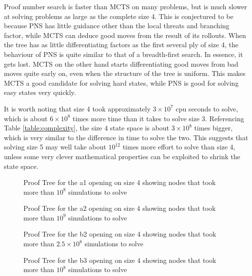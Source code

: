 Proof number search is faster than MCTS on many problems, but is much slower at solving problems as large as the complete size 4. This is conjectured to be because PNS has little guidance other than the local threats and branching factor, while MCTS can deduce good moves from the result of its rollouts. When the tree has as little differentiating factors as the first several ply of size 4, the behaviour of PNS is quite similar to that of a breadth-first search. In essence, it gets lost. MCTS on the other hand starts differentiating good moves from bad moves quite early on, even when the structure of the tree is uniform. This makes MCTS a good candidate for solving hard states, while PNS is good for solving easy states very quickly.

It is worth noting that size 4 took approximately $3 \times 10^7$ cpu seconds to solve, which is about $6 \times 10^8$ times more time than it takes to solve size 3. Referencing Table \ref{table:complexity}, the size 4 state space is about $3 \times 10^8$ times bigger, which is very similar to the difference in time to solve the two. This suggests that solving size 5 may well take about $10^{12}$ times more effort to solve than size 4, unless some very clever mathematical properties can be exploited to shrink the state space. %

\begin{figure}
\centering

\caption[Proof Tree for the a1 Opening on Size 4]{Proof Tree for the a1 opening on size 4 showing nodes that took more than $10^8$ simulations to solve}
\label{fig:proof-a1}
\end{figure}

\begin{figure}
\centering

\caption[Proof Tree for the a2 Opening on Size 4]{Proof Tree for the a2 opening on size 4 showing nodes that took more than $10^9$ simulations to solve}
\label{fig:proof-a2}
\end{figure}

\begin{figure}
\centering

\caption[Proof Tree for the b2 Opening on Size 4]{Proof Tree for the b2 opening on size 4 showing nodes that took more than $2.5 \times 10^8$ simulations to solve}
\label{fig:proof-b2}
\end{figure}

\begin{figure}
\centering

\caption[Proof Tree for the b3 Opening on Size 4]{Proof Tree for the b3 opening on size 4 showing nodes that took more than $10^8$ simulations to solve}
\label{fig:proof-b3}
\end{figure}

